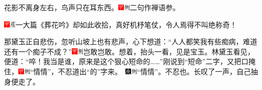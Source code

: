 花影不离身左右，鸟声只在耳东西。{\includegraphics[width=3mm]{../Images/00002}\includegraphics[width=3mm]{../Images/00011}\footnotesize \kaishu 二句作禅语参。}

{{\includegraphics[width=3mm]{../Images/00002}\includegraphics[width=3mm]{../Images/00010}\footnotesize \kaishu 一大篇《葬花吟》却如此收拾，真好机杼笔仗，令人焉得不叫绝称奇！}}

那黛玉正自悲伤，忽听山坡上也有悲声，心下想道：“人人都笑我有些痴病，难道还有一个痴子不成？”{\includegraphics[width=3mm]{../Images/00002}\includegraphics[width=3mm]{../Images/00011}\footnotesize \kaishu 岂敢岂敢。}想着，抬头一看，见是宝玉。林黛玉看见，便道：“啐！我当是谁，原来是这个狠心短命的\ldots{}\ldots{}”刚说到“短命”二字，又把口掩住，{\includegraphics[width=3mm]{../Images/00002}\includegraphics[width=3mm]{../Images/00011}\footnotesize \kaishu “情情”，不忍道出“的”字来。　\includegraphics[width=3mm]{../Images/00004}\includegraphics[width=3mm]{../Images/00011}\footnotesize \kaishu “情情”。不忍也。}长叹了一声，自己抽身便走了。

